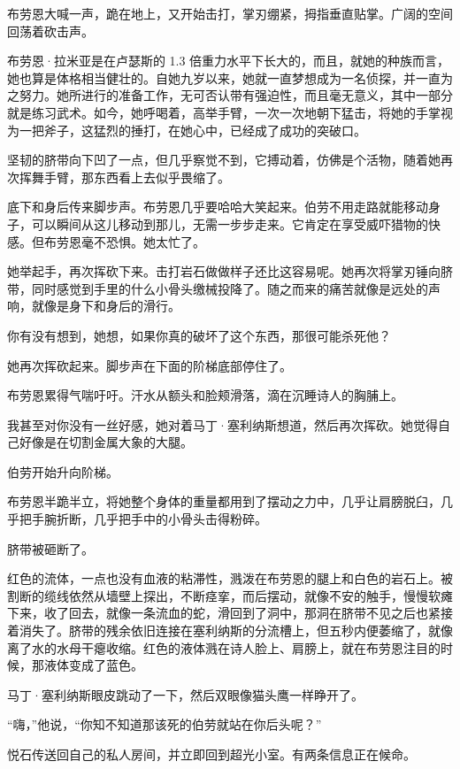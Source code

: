\documentclass[AutoFakeBold=true]{book}
\begin{document}
布劳恩大喊一声，跪在地上，又开始击打，掌刃绷紧，拇指垂直贴掌。广阔的空间回荡着砍击声。

布劳恩·拉米亚是在卢瑟斯的 1.3 倍重力水平下长大的，而且，就她的种族而言，她也算是体格相当健壮的。自她九岁以来，她就一直梦想成为一名侦探，并一直为之努力。她所进行的准备工作，无可否认带有强迫性，而且毫无意义，其中一部分就是练习武术。如今，她呼喝着，高举手臂，一次一次地朝下猛击，将她的手掌视为一把斧子，这猛烈的捶打，在她心中，已经成了成功的突破口。

坚韧的脐带向下凹了一点，但几乎察觉不到，它搏动着，仿佛是个活物，随着她再次挥舞手臂，那东西看上去似乎畏缩了。

底下和身后传来脚步声。布劳恩几乎要哈哈大笑起来。伯劳不用走路就能移动身子，可以瞬间从这儿移动到那儿，无需一步步走来。它肯定在享受威吓猎物的快感。但布劳恩毫不恐惧。她太忙了。

她举起手，再次挥砍下来。击打岩石做做样子还比这容易呢。她再次将掌刃锤向脐带，同时感觉到手里的什么小骨头缴械投降了。随之而来的痛苦就像是远处的声响，就像是身下和身后的滑行。

{\kaishu 你有没有想到，}她想，{\kaishu 如果你真的破坏了这个东西，那很可能杀死他？}

她再次挥砍起来。脚步声在下面的阶梯底部停住了。

布劳恩累得气喘吁吁。汗水从额头和脸颊滑落，滴在沉睡诗人的胸脯上。

{\kaishu 我甚至对你没有一丝好感}，她对着马丁·塞利纳斯想道，然后再次挥砍。她觉得自己好像是在切割金属大象的大腿。

伯劳开始升向阶梯。

布劳恩半跪半立，将她整个身体的重量都用到了摆动之力中，几乎让肩膀脱臼，几乎把手腕折断，几乎把手中的小骨头击得粉碎。

脐带被砸断了。

红色的流体，一点也没有血液的粘滞性，溅泼在布劳恩的腿上和白色的岩石上。被割断的缆线依然从墙壁上探出，不断痉挛，而后摆动，就像不安的触手，慢慢软瘫下来，收了回去，就像一条流血的蛇，滑回到了洞中，那洞在脐带不见之后也紧接着消失了。脐带的残余依旧连接在塞利纳斯的分流槽上，但五秒内便萎缩了，就像离了水的水母干瘪收缩。红色的液体溅在诗人脸上、肩膀上，就在布劳恩注目的时候，那液体变成了蓝色。

马丁·塞利纳斯眼皮跳动了一下，然后双眼像猫头鹰一样睁开了。

``嗨，''他说，``你知不知道那该死的伯劳就站在你后头呢？''

\vspace*{1em}

悦石传送回自己的私人房间，并立即回到超光小室。有两条信息正在候命。
\end{document}
